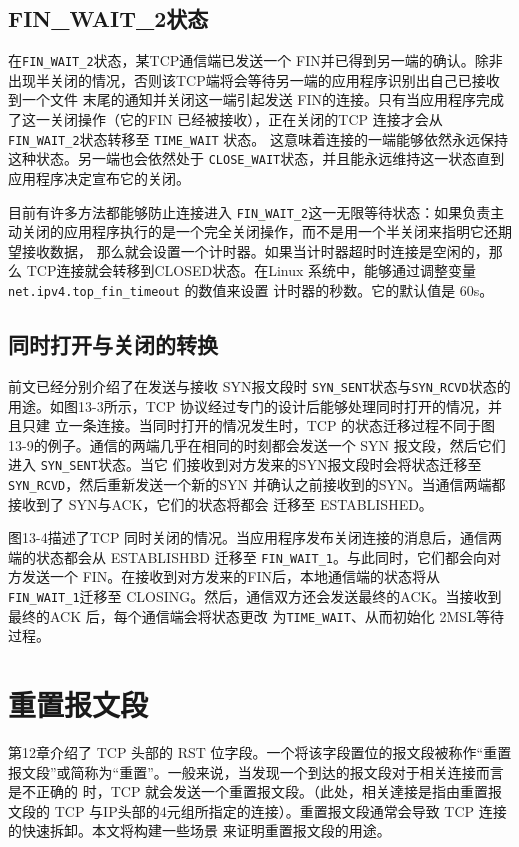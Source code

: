 \subsection{FIN\_WAIT\_2状态}
在\verb|FIN_WAIT_2|状态，某TCP通信端已发送一个 FIN并已得到另一端的确认。除非出现半关闭的情况，否则该TCP端将会等待另一端的应用程序识别出自己已接收到一个文件
末尾的通知并关闭这一端引起发送 FIN的连接。只有当应用程序完成了这一关闭操作（它的FIN 已经被接收），正在关闭的TCP 连接才会从 \verb|FIN_WAIT_2|状态转移至 \verb|TIME_WAIT| 状态。
这意味着连接的一端能够依然永远保持这种状态。另一端也会依然处于 \verb|CLOSE_WAIT|状态，并且能永远维持这一状态直到应用程序决定宣布它的关闭。

目前有许多方法都能够防止连接进入 \verb|FIN_WAIT_2|这一无限等待状态：如果负责主动关闭的应用程序执行的是一个完全关闭操作，而不是用一个半关闭来指明它还期望接收数据，
那么就会设置一个计时器。如果当计时器超时时连接是空闲的，那么 TCP连接就会转移到CLOSED状态。在Linux 系统中，能够通过调整变量 \verb|net.ipv4.top_fin_timeout| 的数值来设置
计时器的秒数。它的默认值是 60s。
\subsection{同时打开与关闭的转换}
前文已经分别介绍了在发送与接收 SYN报文段时 \verb|SYN_SENT|状态与\verb|SYN_RCVD|状态的用途。如图13-3所示，TCP 协议经过专门的设计后能够处理同时打开的情况，并且只建
立一条连接。当同时打开的情况发生时，TCP 的状态迁移过程不同于图13-9的例子。通信的两端几乎在相同的时刻都会发送一个 SYN 报文段，然后它们进入 \verb|SYN_SENT|状态。当它
们接收到对方发来的SYN报文段时会将状态迁移至\verb|SYN_RCVD|，然后重新发送一个新的SYN 并确认之前接收到的SYN。当通信两端都接收到了 SYN与ACK，它们的状态将都会
迁移至 ESTABLISHED。

图13-4描述了TCP 同时关闭的情况。当应用程序发布关闭连接的消息后，通信两端的状态都会从 ESTABLISHBD 迁移至 \verb|FIN_WAIT_1|。与此同时，它们都会向对方发送一个
FIN。在接收到对方发来的FIN后，本地通信端的状态将从 \verb|FIN_WAIT_1|迁移至 CLOSING。然后，通信双方还会发送最终的ACK。当接收到最终的ACK 后，每个通信端会将状态更改
为\verb|TIME_WAIT|、从而初始化 2MSL等待过程。
\section{重置报文段}
第12章介绍了 TCP 头部的 RST 位字段。一个将该字段置位的报文段被称作“重置报文段”或简称为“重置”。一般来说，当发现一个到达的报文段对于相关连接而言是不正确的
时，TCP 就会发送一个重置报文段。（此处，相关達接是指由重置报文段的 TCP 与IP头部的4元组所指定的连接）。重置报文段通常会导致 TCP 连接的快速拆卸。本文将构建一些场景
来证明重置报文段的用途。
